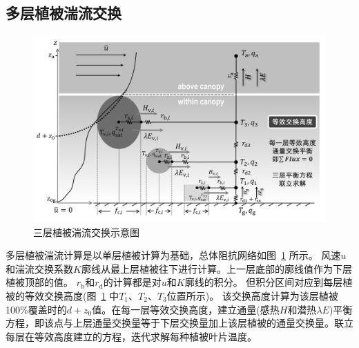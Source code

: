 \subsection{多层植被湍流交换}\label{多层植被湍流交换}
{
  \begin{figure}[htbp]
    \centering
    \includegraphics[width=1\linewidth]{Figures/地表湍流交换过程/三层植被湍流交换示意图_v4.jpg}
    \caption{三层植被湍流交换示意图}
    \label{fig:三层植被湍流交换示意图}
  \end{figure}
}

多层植被湍流计算是以单层植被计算为基础，总体阻抗网络如图~\ref{fig:三层植被湍流交换示意图} 所示。
风速$u$和湍流交换系数$K$廓线从最上层植被往下进行计算。上一层底部的廓线值作为下层植被顶部的值。
$r_{\mathrm {b}}$和$r_{\mathrm {d}}$的计算都是对$u$和$K$廓线的积分。
但积分区间对应到每层植被的等效交换高度(图~\ref{fig:三层植被湍流交换示意图} 中$T_{1}$、$T_{2}$、$T_{3}$位置所示)。
该交换高度计算为该层植被100\%覆盖时的$d+z_0$值。在每一层等效交换高度，建立通量(感热$H$和潜热$\lambda E$)平衡方程，即该点与上层通量交换量等于下层交换量加上该层植被的通量交换量。联立每层在等效高度建立的方程，迭代求解每种植被叶片温度。

